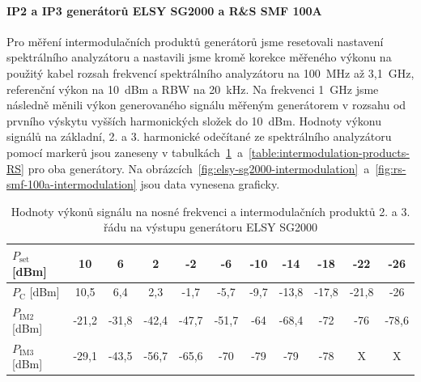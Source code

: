 \documentclass[11pt,a4paper]{article}
\begin{document}
\paragraph*{IP2 a IP3 generátorů ELSY SG2000 a R\&S SMF 100A} Pro měření intermodulačních produktů generátorů jsme resetovali nastavení spektrálního analyzátoru a nastavili jsme kromě korekce měřeného výkonu na použitý kabel rozsah frekvencí spektrálního analyzátoru na 100~MHz až 3,1~GHz, referenční výkon na 10~dBm a RBW na 20~kHz. Na frekvenci 1~GHz jsme následně měnili výkon generovaného signálu měřeným generátorem v rozsahu od prvního výskytu vyšších harmonických složek do 10~dBm. Hodnoty výkonu signálů na základní, 2. a 3. harmonické odečítané ze spektrálního analyzátoru pomocí markerů jsou zaneseny v tabulkách~\ref{table:intermodulation-products-ELSY}~a~\ref{table:intermodulation-products-RS} pro oba generátory. Na obrázcích~\ref{fig:elsy-sg2000-intermodulation}~a~\ref{fig:rs-smf-100a-intermodulation} jsou data vynesena graficky.

\begin{table}[!ht]
\begin{center}
\begin{tabular}{| l || c | c | c | c | c | c | c | c | c | c |}
    \hline
    $P_{\mathrm{set}}$ [dBm] & 10 & 6 & 2 & -2 & -6 & -10 & -14 & -18 & -22 & -26 \\
    \hline
    $P_{\mathrm{C}}$ [dBm] & 10,5 & 6,4 & 2,3 & -1,7 & -5,7 & -9,7 & -13,8 & -17,8 & -21,8 & -26 \\
    \hline
    $P_{\mathrm{IM2}}$ [dBm] & -21,2 & -31,8 & -42,4 & -47,7 & -51,7 & -64 & -68,4 & -72 & -76 & -78,6 \\
    \hline
    $P_{\mathrm{IM3}}$ [dBm] & -29,1 & -43,5 & -56,7 & -65,6 & -70 & -79 & -79 & -78 & X & X \\
    \hline
\end{tabular}
\caption{Hodnoty výkonů signálu na nosné frekvenci a intermodulačních produktů 2. a 3. řádu na výstupu generátoru ELSY SG2000}
\label{table:intermodulation-products-ELSY}
\end{center}
\end{table}
\end{document}
